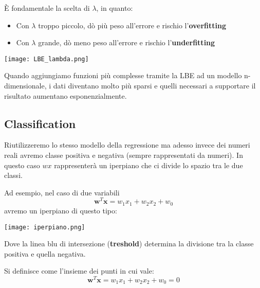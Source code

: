 \noindent È fondamentale la scelta di $\lambda$, in quanto:
\begin{itemize}
	\item Con $\lambda$ troppo piccolo, dò più peso all'errore e rischio l'\textbf{overfitting}
	\item Con $\lambda$ grande, dò meno peso all'errore e rischio l'\textbf{underfitting}
\end{itemize}
\begin{center}
	\texttt{[image: LBE\_lambda.png]}
\end{center}

\begin{observation}
	Quando aggiungiamo funzioni più complesse tramite la LBE ad un modello n-dimensionale, i dati diventano molto più sparsi e quelli necessari a supportare il risultato aumentano esponenzialmente.
\end{observation}

\subsection{Classification}
Riutilizzeremo lo stesso modello della regressione ma adesso invece dei numeri reali avremo classe positiva e negativa (sempre rappresentati da numeri). In questo caso $wx$ rappresenterà un iperpiano che ci divide lo spazio tra le due classi.

\begin{example}[Iperpiano]
	Ad esempio, nel caso di due variabili
	\begin{equation*}
		\mathbf{w}^T\mathbf{x} = w_1x_1 + w_2x_2 + w_0
	\end{equation*}
	avremo un iperpiano di questo tipo:
	\begin{center}
		\texttt{[image: iperpiano.png]}
	\end{center}
	Dove la linea blu di intersezione (\textbf{treshold}) determina la divisione tra la classe positiva e quella negativa.
\end{example}

\begin{definition}
	Si definisce come l'insieme dei punti in cui vale:
	\begin{equation}
		\mathbf{w}^T\mathbf{x} = w_1x_1 + w_2x_2 + w_0 = 0
	\end{equation}
\end{definition}

